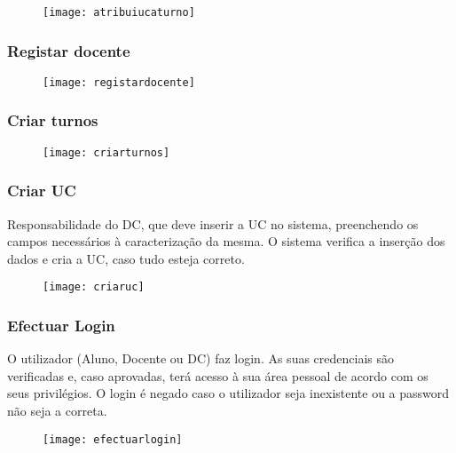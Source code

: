 \documentclass[a4paper]{article}
\begin{document}
\begin{figure}[H]
\centering
\texttt{[image: atribuiucaturno]}
\caption{}
\label{fig:5}
\end{figure}


\subsubsection{Registar docente}

\begin{figure}[H]
\centering
\texttt{[image: registardocente]}
\caption{}
\label{fig:6}
\end{figure}


\subsubsection{Criar turnos}

\begin{figure}[H]
\centering
\texttt{[image: criarturnos]}
\caption{}
\label{fig:7}
\end{figure}


\subsubsection{Criar UC}
\hspace{3mm}Responsabilidade do DC, que deve inserir a UC no sistema, preenchendo os campos necessários à caracterização da mesma. O sistema verifica a inserção dos dados e cria a UC, caso tudo esteja correto.


\begin{figure}[H]
\centering
\texttt{[image: criaruc]}
\caption{}
\label{fig:8}
\end{figure}


\subsubsection{Efectuar Login}
\hspace{3mm}O utilizador (Aluno, Docente ou DC) faz login. As suas credenciais são verificadas e, caso aprovadas, terá acesso à sua área pessoal de acordo com os seus privilégios. O login é negado caso o utilizador seja inexistente ou a password não seja a correta.

\begin{figure}[H]
\centering
\texttt{[image: efectuarlogin]}
\caption{}
\label{fig:9}
\end{figure}
\end{document}
